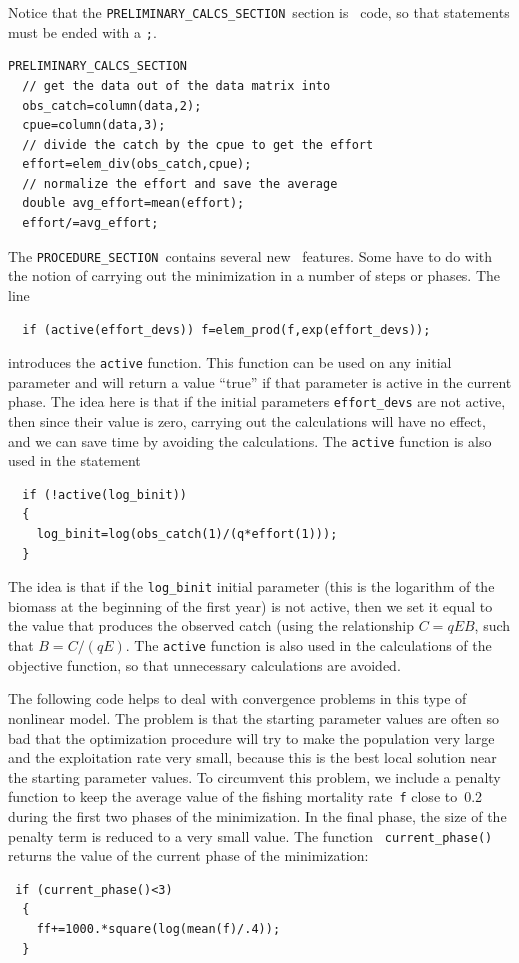 \documentclass{admbmanual}
\newcommand\PCS{\texttt{PRELIMINARY\_CALCS\_SECTION}}
\newcommand\PROS{\texttt{PROCEDURE\_SECTION}}
\begin{document}
Notice that the \PCS\ section is \cplus\ code, so that statements 
must be ended with a \texttt{;}.
\begin{lstlisting}
PRELIMINARY_CALCS_SECTION
  // get the data out of the data matrix into 
  obs_catch=column(data,2);  
  cpue=column(data,3);  
  // divide the catch by the cpue to get the effort
  effort=elem_div(obs_catch,cpue);
  // normalize the effort and save the average
  double avg_effort=mean(effort);
  effort/=avg_effort;
\end{lstlisting}
The \PROS\ contains several new \ADM\ features. Some have to do with
the notion of carrying out the minimization in a number of steps
or phases. The line
\begin{lstlisting}
  if (active(effort_devs)) f=elem_prod(f,exp(effort_devs));
\end{lstlisting}
introduces the \texttt{active} function. This function can be used on
any initial parameter and will return a value ``true'' if
that parameter is active in the current phase. The idea here is that
if the initial parameters \texttt{effort\_devs} are not active, then
since their value is zero, carrying out the calculations will have no
effect, and we can save time by avoiding the calculations. 
The \texttt{active} function is also used in the statement
\begin{lstlisting}
  if (!active(log_binit))
  {
    log_binit=log(obs_catch(1)/(q*effort(1)));
  }
\end{lstlisting}
The idea is that if the \texttt{log\_binit} initial parameter 
(this is the logarithm of the biomass at the beginning of the first year)
is not active, then we set it equal to the value that produces the
observed catch (using the relationship $C=qEB$, such that 
$B=C/(qE)$. 
The \texttt{active} function is also used in the calculations of
the objective function, so that unnecessary calculations are
avoided.

The following code helps to deal with convergence problems in this
type of nonlinear model. The problem is that the starting
parameter values are often so bad that the optimization
procedure will try to make the population very large
and the exploitation rate very small, because this is
the best local solution near the starting
 parameter values. To circumvent this
problem, we include a penalty function to keep the average
value of the fishing mortality rate~\texttt{f} close to~0.2
during the first two phases of the minimization. 
In the final phase, the size of 
the penalty term is reduced to a very small value. The function
\texttt{ current\_phase()}
returns the value of the current phase
of the minimization:
\begin{lstlisting}
 if (current_phase()<3)
  {
    ff+=1000.*square(log(mean(f)/.4));
  }
\end{lstlisting}
\end{document}
